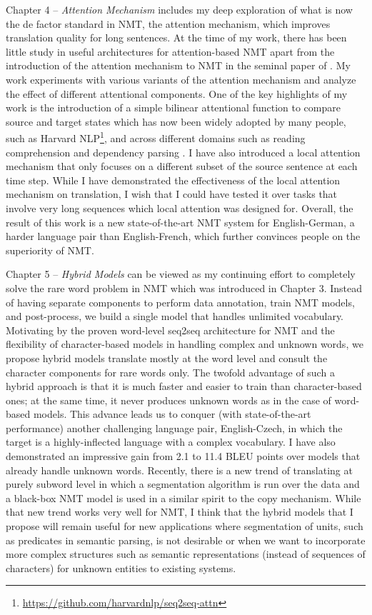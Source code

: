 Chapter 4 -- {\it Attention Mechanism} includes my deep exploration of what is now the de factor standard in NMT, the attention mechanism, which improves translation quality for long sentences. At the time of my work, there has been little study in useful architectures for attention-based NMT apart from the introduction of the attention mechanism to NMT in the seminal paper of . My work experiments with various variants of the attention mechanism and analyze the effect of different attentional components. One of the key highlights of my work is the introduction of a simple bilinear attentional function to compare source and target states which has now been widely adopted by many people, such as Harvard NLP\footnote{\url{https://github.com/harvardnlp/seq2seq-attn}}, and across different domains such as reading comprehension \cite{chen16} and dependency parsing \cite{dozat16}. I have also introduced a local attention mechanism that only focuses on a different subset of the source sentence at each time step. While I have demonstrated the effectiveness of the local attention mechanism on translation, I wish that I could have tested it over tasks that involve very long sequences which local attention was designed for. Overall, the result of this work is a new state-of-the-art NMT system for English-German, a harder language pair than English-French, which further convinces people on the superiority of NMT.

Chapter 5 -- {\it Hybrid Models} can be viewed as my continuing effort to completely solve the rare word problem in NMT which was introduced in Chapter 3.
Instead of having separate components to perform data annotation, train NMT models, and post-process, we build a single model that handles unlimited vocabulary. Motivating by the proven word-level seq2seq architecture for NMT and the flexibility of character-based models in handling complex and unknown words, we propose hybrid models translate mostly at the word level and consult the character components for rare words only. The twofold advantage of such a hybrid approach is that it is much faster and easier to train than character-based ones; at the same time, it never produces unknown words as in the case of word-based models. This advance leads us to conquer (with state-of-the-art performance) another challenging language pair, English-Czech, in which the target is a highly-inflected language with a complex vocabulary. I have also demonstrated an impressive gain from 2.1 to 11.4 BLEU points over models that already handle unknown words. Recently, there is a new trend of translating at purely subword level \cite{sennrich16sub,gnmt16} in which a segmentation algorithm is run over the data and a black-box NMT model is used in a similar spirit to the copy mechanism. While that new trend works very well for NMT, I think that the hybrid models that I propose will remain useful for new applications where segmentation of units, such as predicates in semantic parsing, is not desirable or when we want to incorporate more complex structures such as semantic representations (instead of sequences of characters) for unknown entities to existing systems.

